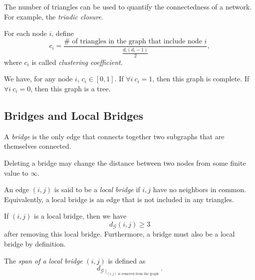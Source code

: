 \begin{eg}
	The number of triangles can be used to quantify the connectedness of a network. For example, the \emph{triadic closure}.
\end{eg}

\begin{definition}
	For each node \(i\), define
	\[
		c_{i} = \dfrac{\#\text{ of triangles in the graph that include node }i}{\frac{d_{i}(d_{i}-1)}{2}},
	\]
	where \(c_{i}\) is called \emph{clustering coefficient}.
\end{definition}
\begin{remark}
	We have, for any node \(i\), \(c_{i}\in \left[ 0, 1 \right].\) If \(\forall i\ c_{i} = 1\), then this graph is complete. If \(\forall i\ c_{i} = 0\), then
	this graph is a tree.
\end{remark}

\subsection{Bridges and Local Bridges}
\begin{definition}[Bridge]
	A \emph{bridge} is the only edge that connects together two subgraphs that are themselves connected.
\end{definition}

\begin{remark}
	Deleting a bridge may change the distance between two nodes from some finite value to \(\infty\).
\end{remark}

\begin{definition}
	An edge \((i, j)\) is said to be a \emph{local bridge} if \(i, j\) have no neighbors in common. Equivalently, a local bridge is an edge that is not included in any
	triangles.
\end{definition}

\begin{remark}
	If \((i, j)\) is a local bridge, then we have
	\[
		d_{\mathcal{G}}(i, j) \geq  3
	\]
	after removing this local bridge. Furthermore, a bridge must also be a local bridge by definition.
\end{remark}

\begin{definition}
	The \emph{span of a local bridge} \((i, j)\) is defined as
	\[
		d_{\mathcal{G}\mid_{(i, j)\text{ is removed from the graph}}}.
	\]
\end{definition}

